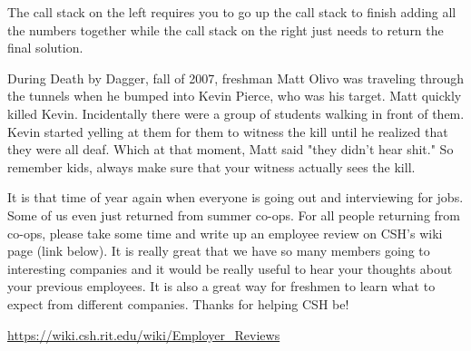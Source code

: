 \documentclass[9pt]{extarticle} %
\begin{document}
\begin{minipage}[t]{.66\linewidth}
The call stack on the left requires you to go up the call stack to finish
adding all the numbers together while the call stack on the right just
needs to return the final solution.


\hypertarget{secondnews}{} 

During Death by Dagger, fall of 2007, freshman Matt Olivo was traveling 
through the tunnels when he bumped into Kevin Pierce, who was his target.
Matt quickly killed Kevin. Incidentally there were a group of students walking
in front of them. Kevin started yelling at them for them to witness the kill
until he realized that they were all deaf. Which at that moment, Matt said 
"they didn't hear shit." So remember kids, always make sure that your witness
actually sees the kill.

\hypertarget{thirdnews}{} 

It is that time of year again when everyone is going out and interviewing for 
jobs. Some of us even just returned from summer co-ops. For all people returning from co-ops, please take some time and write up an employee review on CSH's 
wiki page (link below). It is really great that we have so many members going
to interesting companies and it would be really useful to hear your thoughts
about your previous employees. It is also a great way for freshmen to learn 
what to expect from different companies. Thanks for helping CSH be!
\centerline{\url{https://wiki.csh.rit.edu/wiki/Employer_Reviews}}

\end{minipage} %
\end{document}
